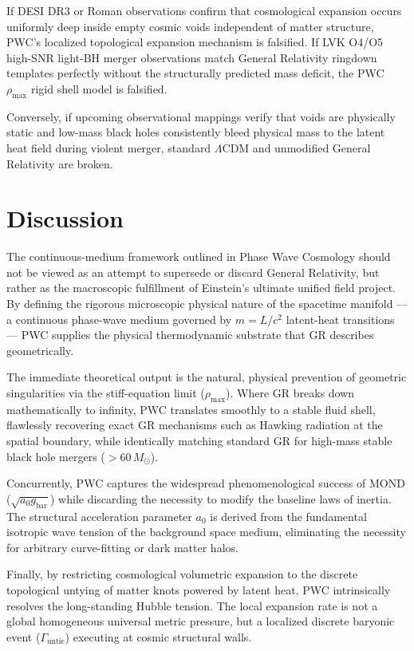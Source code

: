 \documentclass[aps,prd,twocolumn,superscriptaddress,amsmath,amssymb,nofootinbib,floatfix]{revtex4-2}
\newcommand{\Msun}{M_{\odot}}
\newcommand{\rhomax}{\rho_{\max}}
\begin{document}
If DESI DR3 or Roman observations confirm that cosmological expansion occurs uniformly deep inside empty cosmic voids independent of matter structure, PWC's localized topological expansion mechanism is falsified. If LVK O4/O5 high-SNR light-BH merger observations match General Relativity ringdown templates perfectly without the structurally predicted mass deficit, the PWC $\rhomax$ rigid shell model is falsified.

Conversely, if upcoming observational mappings verify that voids are physically static and low-mass black holes consistently bleed physical mass to the latent heat field during violent merger, standard $\Lambda$CDM and unmodified General Relativity are broken.

\section{Discussion}
\label{sec:discussion}

The continuous-medium framework outlined in Phase Wave Cosmology should not be viewed as an attempt to supersede or discard General Relativity, but rather as the macroscopic fulfillment of Einstein's ultimate unified field project. By defining the rigorous microscopic physical nature of the spacetime manifold --- a continuous phase-wave medium governed by $m = L/c^2$ latent-heat transitions --- PWC supplies the physical thermodynamic substrate that GR describes geometrically.

The immediate theoretical output is the natural, physical prevention of geometric singularities via the stiff-equation limit ($\rhomax$). Where GR breaks down mathematically to infinity, PWC translates smoothly to a stable fluid shell, flawlessly recovering exact GR mechanisms such as Hawking radiation at the spatial boundary, while identically matching standard GR for high-mass stable black hole mergers ($>60\,\Msun$).

Concurrently, PWC captures the widespread phenomenological success of MOND ($\sqrt{a_0 g_{\text{bar}}}$) while discarding the necessity to modify the baseline laws of inertia. The structural acceleration parameter $a_0$ is derived from the fundamental isotropic wave tension of the background space medium, eliminating the necessity for arbitrary curve-fitting or dark matter halos.

Finally, by restricting cosmological volumetric expansion to the discrete topological untying of matter knots powered by latent heat, PWC intrinsically resolves the long-standing Hubble tension. The local expansion rate is not a global homogeneous universal metric pressure, but a localized discrete baryonic event ($\Gamma_{\text{untie}}$) executing at cosmic structural walls.
\end{document}
